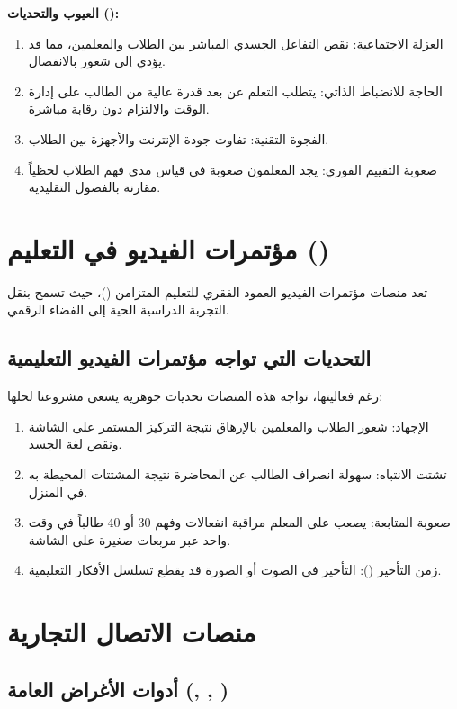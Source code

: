 \textbf{العيوب والتحديات ():}

\begin{enumerate}
  \item العزلة الاجتماعية: نقص التفاعل الجسدي المباشر بين الطلاب والمعلمين، مما قد يؤدي إلى شعور بالانفصال.
  \item الحاجة للانضباط الذاتي: يتطلب التعلم عن بعد قدرة عالية من الطالب على إدارة الوقت والالتزام دون رقابة مباشرة.
  \item الفجوة التقنية: تفاوت جودة الإنترنت والأجهزة بين الطلاب.
  \item صعوبة التقييم الفوري: يجد المعلمون صعوبة في قياس مدى فهم الطلاب لحظياً مقارنة بالفصول التقليدية.
\end{enumerate}

\section{مؤتمرات الفيديو في التعليم ()}

تعد منصات مؤتمرات الفيديو العمود الفقري للتعليم المتزامن ()، حيث تسمح بنقل التجربة الدراسية الحية إلى الفضاء الرقمي.

\subsection{التحديات التي تواجه مؤتمرات الفيديو التعليمية}

رغم فعاليتها، تواجه هذه المنصات تحديات جوهرية يسعى مشروعنا لحلها:

\begin{enumerate}
  \item الإجهاد: شعور الطلاب والمعلمين بالإرهاق نتيجة التركيز المستمر على الشاشة ونقص لغة الجسد.
  \item تشتت الانتباه: سهولة انصراف الطالب عن المحاضرة نتيجة المشتتات المحيطة به في المنزل.
  \item صعوبة المتابعة: يصعب على المعلم مراقبة انفعالات وفهم 30 أو 40 طالباً في وقت واحد عبر مربعات صغيرة على الشاشة.
  \item زمن التأخير (): التأخير في الصوت أو الصورة قد يقطع تسلسل الأفكار التعليمية.
\end{enumerate}

\section{منصات الاتصال التجارية}

\subsection{أدوات الأغراض العامة (, , )}

